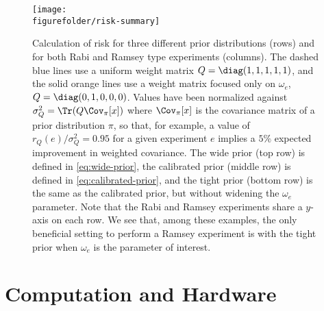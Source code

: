 \documentclass[aps,nofootinbib,twocolumn,superscriptaddress]{revtex4}
\newcommand{\figurefolder}{../fig}
\newcommand{\mps}{x}
\newcommand{\eps}{e}
\begin{document}
\begin{figure}
    \texttt{[image: \\figurefolder/risk-summary]}
    \caption{Calculation of risk for three different prior distributions (rows)
        and for both Rabi and Ramsey type experiments (columns).
        The dashed blue lines use a uniform weight matrix $Q=\diag(1,1,1,1,1)$,
        and the solid orange lines use a weight matrix focused only on $\omega_e$,
        $Q=\diag(0,1,0,0,0)$.
        Values have been normalized against $\sigma_Q^2=\Tr(Q\Cov_{\pi}[\mps])$
        where $\Cov_{\pi}[\mps]$ is the covariance matrix of a prior
        distribution $\pi$,
        so that, for example, a value of $r_Q(\eps)/\sigma_Q^2=0.95$ for a given
        experiment $\eps$
        implies a $5\%$ expected improvement in weighted covariance.
        The wide prior (top row) is defined in \autoref{eq:wide-prior}, the
        calibrated prior (middle row) is defined in \autoref{eq:calibrated-prior},
        and the tight prior (bottom row) is the same as the calibrated prior, but
        without widening the $\omega_e$ parameter.
        Note that the Rabi and Ramsey experiments share a $y$-axis on each row.
        We see that, among these examples, the only beneficial setting to
        perform a Ramsey experiment is with the tight prior when $\omega_e$
        is the parameter of interest.
        }
    \label{fig:risk-summary}
\end{figure}

\section{Computation and Hardware}
\label{sec:computation-and-hardware}
\end{document}
